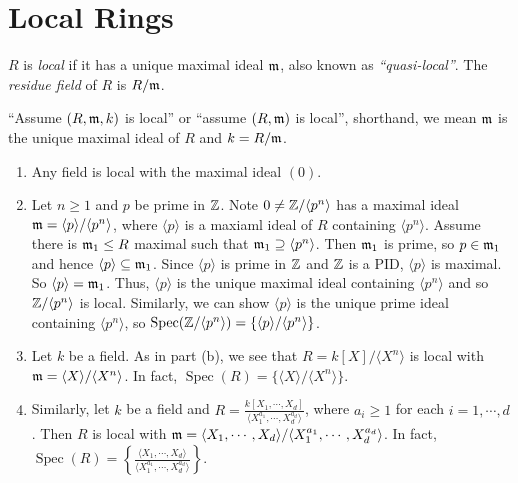 \section*{Local Rings}

\begin{definition}
    $R$ is \emph{local} if it has a unique maximal ideal $\mathfrak{m}$, also known as \emph{``quasi-local''}. The \emph{residue field} of $R$ is $R/\mathfrak{m}$. \par
    ``Assume $(R,\mathfrak{m},k)$ is local'' or ``assume $(R,\mathfrak{m})$ is local'', shorthand, we mean $\mathfrak{m}$ is the unique maximal ideal of $R$ and $k = R/\mathfrak{m}$. 
\end{definition}

\begin{example}
    \begin{enumerate}
        \item Any field is local with the maximal ideal $(0)$.
        \item Let $n \geq 1$ and $p$ be prime in $\mathbb{Z}$. Note $0 \neq \mathbb{Z}/\langle p^n \rangle$ has a maximal ideal $\mathfrak{m} = \langle p \rangle/\langle p^n \rangle$, where $\langle p \rangle$ is a maxiaml ideal of $R$ containing $\langle p^n \rangle$. Assume there is $\mathfrak{m}_1 \leq R$ maximal such that $\mathfrak{m}_1 \supseteq \langle p^n \rangle$. Then $\mathfrak{m}_1$ is prime, so $p \in \mathfrak{m}_1$ and hence $\langle p \rangle \subseteq \mathfrak{m}_1$. Since $\langle p \rangle$ is prime in $\mathbb{Z}$ and $\mathbb{Z}$ is a PID, $\langle p \rangle$ is maximal. So $\langle p \rangle = \mathfrak{m}_1$. Thus, $\langle p \rangle$ is the unique maximal ideal containing $\langle p^n \rangle$ and so $\mathbb{Z}/\langle p^n \rangle$ is local. Similarly, we can show $\langle p \rangle$ is the unique prime ideal containing $\langle p^n \rangle$, so $\operatorname{Spec}(\mathbb{Z}/\langle p^n \rangle) = \left\{\langle p \rangle/\langle p^n \rangle\right\}$. 
        \item Let $k$ be a field. As in part (b), we see that $R = k[X]/\langle X^n \rangle$ is local with $\mathfrak{m} = \langle X \rangle / \langle X^n \rangle$. In fact, $\operatorname{Spec}(R) = \{\langle X \rangle/\langle X^n \rangle\}$.
        \item Similarly, let $k$ be a field and $R = \frac{k[X_1,\cdots,X_d]}{\langle X_1^{a_1}, \cdots, X_d^{a_d}\rangle}$, where $a_i \geq 1$ for each $i = 1,\cdots,d$. Then $R$ is local with $\mathfrak{m} = \langle X_1,\cdots,X_d\rangle/\langle X_1^{a_1},\cdots,X_d^{a_d} \rangle$. In fact, $\operatorname{Spec}(R) = \left\{\frac{\langle X_1,\cdots,X_d\rangle}{\langle X_1^{a_1}, \cdots, X_d^{a_d}\rangle}\right\}$.
    \end{enumerate}
\end{example}

